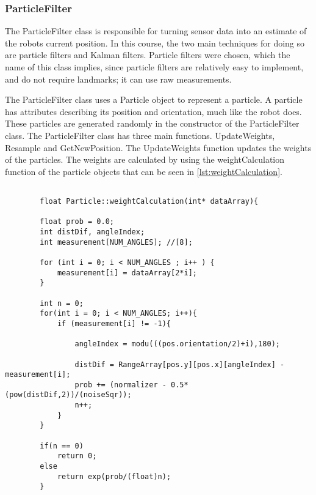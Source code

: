 \documentclass[Main]{subfiles}
\begin{document}
	\subsubsection{ParticleFilter} %
	\label{subsub:software_particlefilter}
	
	The ParticleFilter class is responsible for turning  sensor data into an estimate of the robots current position. 
	In this course, the two main techniques for doing so are particle filters and Kalman filters. 
	Particle filters were chosen, which the name of this class implies, since particle filters are relatively easy to implement, and do not require landmarks; it can use raw measurements.
	
	The ParticleFilter class uses a Particle object to represent a particle. A particle has attributes describing its position and orientation, much like the robot does. 
	These particles are generated randomly in the constructor of the ParticleFilter class.
	The ParticleFilter class has three main functions.
	UpdateWeights, Resample and GetNewPosition.
	The UpdateWeights function updates the weights of the particles. 
	The weights are calculated by using the weightCalculation function of the particle objects that can be seen in \autoref{lst:weightCalculation}.
	
	\begin{lstlisting}[caption=weightCalculation function of particle class, style=Code-C++, label=lst:weightCalculation, basicstyle=\scriptsize]
			
		float Particle::weightCalculation(int* dataArray){
	    
	    float prob = 0.0;
	    int distDif, angleIndex;
	    int measurement[NUM_ANGLES]; //[8];
	
	    for (int i = 0; i < NUM_ANGLES ; i++ ) {
	    	measurement[i] = dataArray[2*i];
	    }
	
	    int n = 0;
	    for(int i = 0; i < NUM_ANGLES; i++){
	        if (measurement[i] != -1){
	        
	        	angleIndex = modu(((pos.orientation/2)+i),180);
	            
	            distDif = RangeArray[pos.y][pos.x][angleIndex] - measurement[i];
	            prob += (normalizer - 0.5*(pow(distDif,2))/(noiseSqr));
	            n++;
	        }
	    }
	    
	    if(n == 0)
	        return 0;
	    else
	        return exp(prob/(float)n);
		}

	\end{lstlisting}
	
\end{document}
